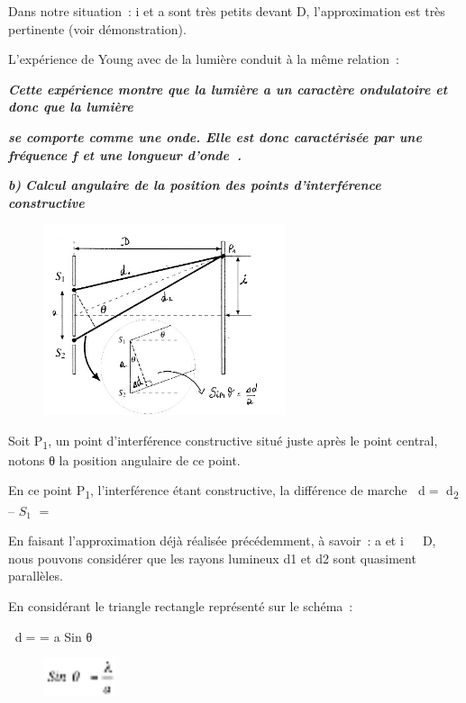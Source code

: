 Dans notre situation~: i et a sont très petits devant D, l'approximation
est très pertinente (voir démonstration).

L'expérience de Young avec de la lumière conduit à la même relation~:

\emph{\textbf{Cette expérience montre que la lumière a un caractère
ondulatoire et donc que la lumière}}

\emph{\textbf{se comporte comme une onde. Elle est donc caractérisée par
une fréquence f et une longueur d'onde }\textbf{}\textbf{.}}

\emph{\textbf{b) }\textbf{Calcul angulaire de la position des points
d'interférence constructive}}

\begin{figure}
\centering
\includegraphics[width=7.071cm,height=5.604cm]{Pictures/10000001000001D8000001766572F750E44C7125.png}
\caption{}
\end{figure}

Soit P\textsubscript{1}, un point d'interférence constructive situé
juste après le point central, notons θ la position angulaire de ce
point.

En ce point P\textsubscript{1}, l'interférence étant constructive, la
différence de marche d= d\textsubscript{2} -- $S_1$ =


En faisant l'approximation déjà réalisée précédemment, à savoir~: a et i
 D, nous pouvons considérer que les rayons lumineux d1 et d2 sont
quasiment parallèles.

En considérant le triangle rectangle représenté sur le schéma~:

d= = a Sin θ

\begin{figure}
\centering
\includegraphics[width=2.095cm,height=1.107cm]{Pictures/100000010000002800000015DDF3AE193165C3E3.png}
\caption{}
\end{figure}

